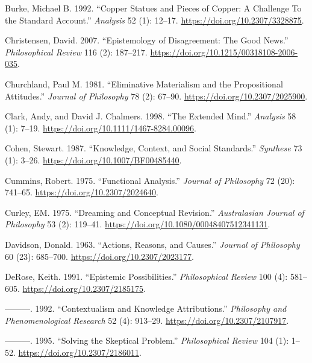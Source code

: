 \documentclass[
  12pt,
  letterpaper,
  DIV=11,
  numbers=noendperiod]{scrartcl}
\newlength{\cslhangindent}
\newenvironment{CSLReferences}[2] %
 {\begin{list}{}{%
  \setlength{\itemindent}{0pt}
  \setlength{\leftmargin}{0pt}
  \setlength{\parsep}{0pt}
  \ifodd #1
   \setlength{\leftmargin}{\cslhangindent}
   \setlength{\itemindent}{-1\cslhangindent}
  \fi
  \setlength{\itemsep}{#2\baselineskip}}}
 {\end{list}}
\begin{document}
\begin{CSLReferences}{1}{0}
Burke, Michael B. 1992. {``Copper Statues and Pieces of Copper: A
Challenge To the Standard Account.''} \emph{Analysis} 52 (1): 12--17.
\url{https://doi.org/10.2307/3328875}.

Christensen, David. 2007. {``Epistemology of Disagreement: The Good
News.''} \emph{Philosophical Review} 116 (2): 187--217.
\url{https://doi.org/10.1215/00318108-2006-035}.

Churchland, Paul M. 1981. {``Eliminative Materialism and the
Propositional Attitudes.''} \emph{Journal of Philosophy} 78 (2): 67--90.
\url{https://doi.org/10.2307/2025900}.

Clark, Andy, and David J. Chalmers. 1998. {``The Extended Mind.''}
\emph{Analysis} 58 (1): 7--19.
\url{https://doi.org/10.1111/1467-8284.00096}.

Cohen, Stewart. 1987. {``Knowledge, Context, and Social Standards.''}
\emph{Synthese} 73 (1): 3--26. \url{https://doi.org/10.1007/BF00485440}.

Cummins, Robert. 1975. {``Functional Analysis.''} \emph{Journal of
Philosophy} 72 (20): 741--65. \url{https://doi.org/10.2307/2024640}.

Curley, EM. 1975. {``Dreaming and Conceptual Revision.''}
\emph{Australasian Journal of Philosophy} 53 (2): 119--41.
\url{https://doi.org/10.1080/00048407512341131}.

Davidson, Donald. 1963. {``Actions, Reasons, and Causes.''}
\emph{Journal of Philosophy} 60 (23): 685--700.
\url{https://doi.org/10.2307/2023177}.

DeRose, Keith. 1991. {``Epistemic Possibilities.''} \emph{Philosophical
Review} 100 (4): 581--605. \url{https://doi.org/10.2307/2185175}.

---------. 1992. {``Contextualism and Knowledge Attributions.''}
\emph{Philosophy and Phenomenological Research} 52 (4): 913--29.
\url{https://doi.org/10.2307/2107917}.

---------. 1995. {``Solving the Skeptical Problem.''}
\emph{Philosophical Review} 104 (1): 1--52.
\url{https://doi.org/10.2307/2186011}.


\end{CSLReferences}
\end{document}
